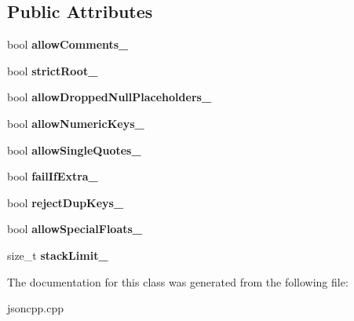 \subsection*{Public Attributes}
\begin{DoxyCompactItemize}
\item 
\mbox{\label{classJson_1_1OurFeatures_ac71bb7ba7363d3b05ed76602b036ce33}} 
bool {\bfseries allow\+Comments\+\_\+}
\item 
\mbox{\label{classJson_1_1OurFeatures_a2095f66a776c0a4ae6cc931a0c94242e}} 
bool {\bfseries strict\+Root\+\_\+}
\item 
\mbox{\label{classJson_1_1OurFeatures_a13963bc44bf948eec1968f7ff8e8f5f1}} 
bool {\bfseries allow\+Dropped\+Null\+Placeholders\+\_\+}
\item 
\mbox{\label{classJson_1_1OurFeatures_af6973fc7e774ce2d634ba99442aeb91a}} 
bool {\bfseries allow\+Numeric\+Keys\+\_\+}
\item 
\mbox{\label{classJson_1_1OurFeatures_abbd6c196d7a22e2a360a59887eda4610}} 
bool {\bfseries allow\+Single\+Quotes\+\_\+}
\item 
\mbox{\label{classJson_1_1OurFeatures_ae8ad25b90706c78f1a8fe929191ac61b}} 
bool {\bfseries fail\+If\+Extra\+\_\+}
\item 
\mbox{\label{classJson_1_1OurFeatures_a39b8e0b86b1c24a45e800c023bb715aa}} 
bool {\bfseries reject\+Dup\+Keys\+\_\+}
\item 
\mbox{\label{classJson_1_1OurFeatures_af760f91cc2a7af37e44f78fb466061bb}} 
bool {\bfseries allow\+Special\+Floats\+\_\+}
\item 
\mbox{\label{classJson_1_1OurFeatures_a98e3ce2d44ff586f31d61c017735a6ae}} 
size\+\_\+t {\bfseries stack\+Limit\+\_\+}
\end{DoxyCompactItemize}


The documentation for this class was generated from the following file\+:\begin{DoxyCompactItemize}
\item 
jsoncpp.\+cpp\end{DoxyCompactItemize}

